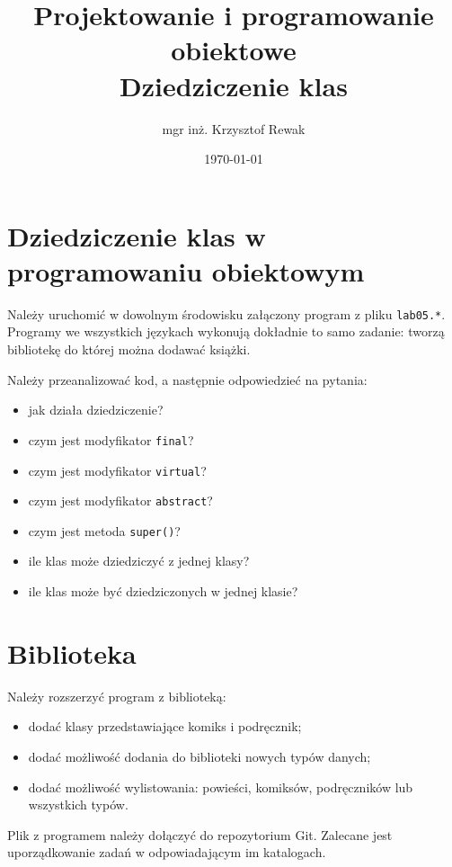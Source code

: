 \documentclass{article}
\title{
	Projektowanie i programowanie obiektowe \\
	\Huge{Dziedziczenie klas}
}
\author{mgr inż. Krzysztof Rewak}
\date{\today}
\begin{document}
	\maketitle

	\section{Dziedziczenie klas w programowaniu obiektowym}	
	Należy uruchomić w dowolnym środowisku załączony program z pliku \texttt{lab05.*}. Programy we wszystkich językach wykonują dokładnie to samo zadanie: tworzą bibliotekę do której można dodawać książki.
	
	Należy przeanalizować kod, a następnie odpowiedzieć na pytania:
	\begin{itemize}
		\item jak działa dziedziczenie?
		\item czym jest modyfikator \texttt{final}?
		\item czym jest modyfikator \texttt{virtual}?
		\item czym jest modyfikator \texttt{abstract}?
		\item czym jest metoda \texttt{super()}?
		\item ile klas może dziedziczyć z jednej klasy?
		\item ile klas może być dziedziczonych w jednej klasie?
	\end{itemize}

	\section{Biblioteka}
	Należy rozszerzyć program z biblioteką:
	\begin{itemize}
		\item dodać klasy przedstawiające komiks i podręcznik;
		\item dodać możliwość dodania do biblioteki nowych typów danych;
		\item dodać możliwość wylistowania: powieści, komiksów, podręczników lub wszystkich typów.
	\end{itemize}
	
	Plik z programem należy dołączyć do repozytorium Git. Zalecane jest uporządkowanie zadań w odpowiadającym im katalogach.
\end{document}
